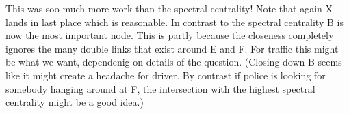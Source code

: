 This was soo much more work than the spectral centrality! Note that again X lands in last place which is reasonable. In contrast to the spectral centrality B is now the most important node. This is partly because the closeness completely ignores the many double links that exist around E and F. For traffic this might be what we want, dependenig on details of the question. (Closing down B seems like it might create a headache for driver. By contrast if police is looking for somebody hanging around at F, the intersection with the highest spectral centrality might be a good idea.)
